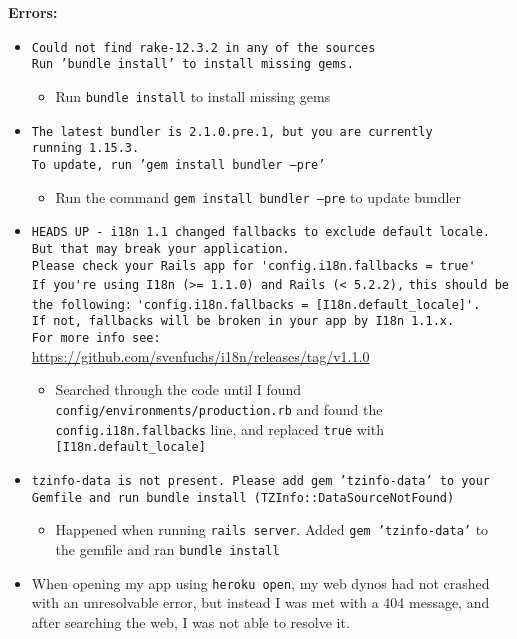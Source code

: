 \documentclass{article}
\begin{document}
\textbf{Errors:}
\begin{itemize}
    \item \texttt{Could not find rake-12.3.2 in any of the sources\\
    Run 'bundle install' to install missing gems.}
    \begin{itemize}
        \item Run \texttt{bundle install} to install missing gems
    \end{itemize}
    \item \texttt{The latest bundler is 2.1.0.pre.1, but you are currently\\ running 1.15.3.\\
    To update, run 'gem install bundler --pre'}
    \begin{itemize}
        \item Run the command \texttt{gem install bundler --pre} to update bundler
    \end{itemize}
    \item \verb|HEADS UP - i18n 1.1 changed fallbacks to exclude default locale.|\\
    \verb|But that may break your application.|\\
    \verb|Please check your Rails app for 'config.i18n.fallbacks = true'|\\
    \verb|If you're using I18n (>= 1.1.0) and Rails (< 5.2.2),|
    \verb|this should be the following:| 
    \verb|'config.i18n.fallbacks = [I18n.default_locale]'.|\\
    \verb|If not, fallbacks will be broken in your app by I18n 1.1.x.|\\
    \verb|For more info see:|\\
    \url{https://github.com/svenfuchs/i18n/releases/tag/v1.1.0}
    \begin{itemize}
        \item Searched through the code until I found \texttt{config/environments/production.rb} and found the \texttt{config.i18n.fallbacks} line, and replaced \texttt{true} with \verb|[I18n.default_locale]|
    \end{itemize}
    \item \texttt{tzinfo-data is not present. Please add gem 'tzinfo-data' to your Gemfile and run bundle install (TZInfo::DataSourceNotFound)}
    \begin{itemize}
        \item Happened when running \texttt{rails server}. Added \texttt{gem 'tzinfo-data'} to the gemfile and ran \texttt{bundle install}
    \end{itemize}
    \item When opening my app using \texttt{heroku open}, my web dynos had not crashed with an unresolvable error, but instead I was met with a 404 message, and after searching the web, I was not able to resolve it.
\end{itemize}
\end{document}
